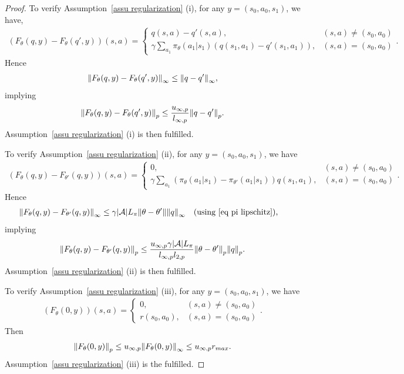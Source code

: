\documentclass[twoside,11pt]{article}
\newcommand{\fA}{\mathcal{A}}
\newcommand{\na}{{|\fA|}}
\numberwithin{assucounter}{section}
\begin{document}
\begin{proof}
  To verify Assumption~\ref{assu regularization} (i), for any $y = (s_0, a_0, s_1)$,
  we have,
  \begin{align}
    \left(F_\theta(q, y) - F_\theta(q', y)\right)(s, a) = \begin{cases}
      q(s, a) - q'(s, a), & (s, a) \neq (s_0, a_0) \\
      \gamma \sum_{a_1}\pi_\theta(a_1| s_1) \left(q(s_1, a_1) - q'(s_1, a_1)\right), &(s, a) = (s_0, a_0)
    \end{cases}.
  \end{align}
  Hence
  \begin{align}
    \norm{F_\theta(q, y) - F_\theta(q', y)}_\infty \leq \norm{q - q'}_\infty,
  \end{align}
  implying
  \begin{align}
    \norm{F_\theta(q, y) - F_\theta(q', y)}_p \leq \frac{u_{\infty, p}}{l_{\infty, p}} \norm{q - q'}_p.
  \end{align}
  Assumption~\ref{assu regularization} (i) is then fulfilled.

  To verify Assumption~\ref{assu regularization} (ii),
  for any $y = (s_0, a_0, s_1)$,
  we have
  \begin{align}
    \left(F_\theta(q, y) - F_{\theta'}(q, y)\right)(s, a) = \begin{cases}
      0, & (s, a) \neq (s_0, a_0) \\
      \gamma \sum_{a_1} \left(\pi_\theta(a_1| s_1) - \pi_{\theta'}(a_1|s_1) \right) q(s_1, a_1), &(s, a) = (s_0, a_0)
    \end{cases}.
  \end{align}
  Hence
  \begin{align}
    \norm{F_\theta(q, y) - F_{\theta'}(q, y)}_\infty \leq \gamma \na L_\pi \norm{\theta - \theta'}\norm{q}_\infty \qq{(using \eqref{eq pi lipschitz}),}
  \end{align}
  implying
  \begin{align}
    \norm{F_\theta(q, y) - F_{\theta'}(q, y)}_p \leq \frac{u_{\infty, p}\gamma \na L_\pi}{l_{\infty, p} l_{2, p}} \norm{\theta - \theta'}_p\norm{q}_p.
  \end{align}
  Assumption~\ref{assu regularization} (ii) is then fulfilled.

  To verify Assumption~\ref{assu regularization} (iii), 
  for any $y = (s_0, a_0, s_1)$,
  we have
  \begin{align}
    \left(F_\theta(0, y)\right)(s, a) = \begin{cases}
      0, & (s, a) \neq (s_0, a_0) \\
      r(s_0, a_0), &(s, a) = (s_0, a_0)
    \end{cases}.
  \end{align}
  Then 
  \begin{align}
    \norm{F_\theta(0, y)}_p \leq u_{\infty, p} \norm{F_\theta(0, y)}_\infty \leq  u_{\infty, p}r_{max}.
  \end{align}
  Assumption~\ref{assu regularization} (iii) is the fulfilled.


\end{proof}
\end{document}
